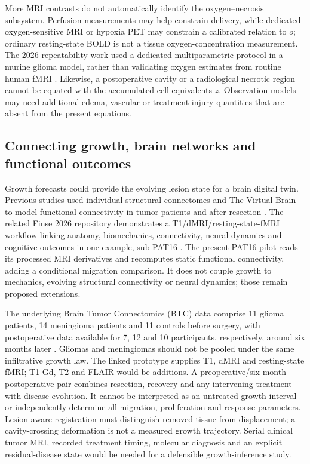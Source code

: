 More MRI contrasts do not automatically identify the oxygen--necrosis subsystem. Perfusion measurements may help constrain delivery, while dedicated oxygen-sensitive MRI or hypoxia PET may constrain a calibrated relation to $o$; ordinary resting-state BOLD is not a tissue oxygen-concentration measurement. The 2026 repeatability work used a dedicated multiparametric protocol in a murine glioma model, rather than validating oxygen estimates from routine human fMRI \citep{das2026}. Likewise, a postoperative cavity or a radiological necrotic region cannot be equated with the accumulated cell equivalents $z$. Observation models may need additional edema, vascular or treatment-injury quantities that are absent from the present equations.

\subsection{Connecting growth, brain networks and functional outcomes}
Growth forecasts could provide the evolving lesion state for a brain digital twin. Previous studies used individual structural connectomes and The Virtual Brain to model functional connectivity in tumor patients and after resection \citep{aerts2018,aerts2020}. The related Finse 2026 repository demonstrates a T1/dMRI/resting-state-fMRI workflow linking anatomy, biomechanics, connectivity, neural dynamics and cognitive outcomes in one example, sub-PAT16 \citep{lundervold2026twin}. The present PAT16 pilot reads its processed MRI derivatives and recomputes static functional connectivity, adding a conditional migration comparison. It does not couple growth to mechanics, evolving structural connectivity or neural dynamics; those remain proposed extensions.

The underlying Brain Tumor Connectomics (BTC) data comprise 11 glioma patients, 14 meningioma patients and 11 controls before surgery, with postoperative data available for 7, 12 and 10 participants, respectively, around six months later \citep{aerts2022}. Gliomas and meningiomas should not be pooled under the same infiltrative growth law. The linked prototype supplies T1, dMRI and resting-state fMRI; T1-Gd, T2 and FLAIR would be additions. A preoperative/six-month-postoperative pair combines resection, recovery and any intervening treatment with disease evolution. It cannot be interpreted as an untreated growth interval or independently determine all migration, proliferation and response parameters. Lesion-aware registration must distinguish removed tissue from displacement; a cavity-crossing deformation is not a measured growth trajectory. Serial clinical tumor MRI, recorded treatment timing, molecular diagnosis and an explicit residual-disease state would be needed for a defensible growth-inference study.

